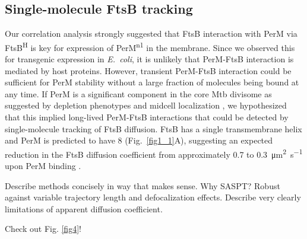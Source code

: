 \documentclass[pdflatex,sn-basic]{sn-jnl}%
\newcommand\ec{\textit{E.~coli}}
\newcommand\mtb{Mtb}
\newcommand\ftsbH{FtsB\textsuperscript{H}}
\newcommand\permN{PerM\textsuperscript{n1}}
\begin{document}
\subsection{Single-molecule FtsB tracking}

Our correlation analysis strongly suggested that FtsB interaction with PerM via \ftsbH{} is key for expression of \permN{} in the membrane. Since we observed this for transgenic expression in \ec{}, it is unlikely that PerM-FtsB interaction is mediated by host proteins. However, transient PerM-FtsB interaction could be sufficient for PerM stability without a large fraction of molecules being bound at any time. If PerM is a significant component in the core \mtb{} divisome as suggested by depletion phenotypes and midcell localization \citep{goodsmithDisruptionTuberculosisMembrane2015, wangPersistentMycobacteriumTuberculosis2019}, we hypothesized that this implied long-lived PerM-FtsB interactions that could be detected by single-molecule tracking of FtsB diffusion. FtsB has a single transmembrane helix and PerM is predicted to have 8 (Fig.~\ref{fig1_1}A), suggesting an expected reduction in the FtsB diffusion coefficient from approximately 0.7 to \qty{0.3}{\square\um\per\s} upon PerM binding \citep{lucenaMicrodomainFormationGeneral2018}.

Describe methods concisely in way that makes sense. Why SASPT?
Robust against variable trajectory length and defocalization effects.
Describe very clearly limitations of apparent diffusion coefficient.

\loremipsum{}

Check out Fig. \ref{fig4}!
\end{document}
